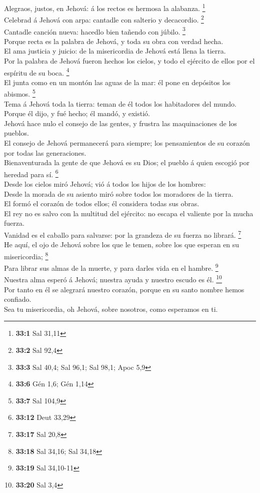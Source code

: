  Alegraos, justos, en Jehová: á los rectos es hermosa la
alabanza. \footnote{\textbf{33:1} Sal 31,11}\\
 Celebrad á Jehová con arpa: cantadle con salterio y
decacordio. \footnote{\textbf{33:2} Sal 92,4}\\
 Cantadle canción nueva: hacedlo bien tañendo con júbilo.
\footnote{\textbf{33:3} Sal 40,4; Sal 96,1; Sal 98,1; Apoc 5,9}\\
 Porque recta es la palabra de Jehová, y toda su obra con
verdad hecha.\\
 El ama justicia y juicio: de la misericordia de Jehová está
llena la tierra.\\
 Por la palabra de Jehová fueron hechos los cielos, y todo
el ejército de ellos por el espíritu de su boca. \footnote{\textbf{33:6}
  Gén 1,6; Gén 1,14}\\
 El junta como en un montón las aguas de la mar: él pone en
depósitos los abismos. \footnote{\textbf{33:7} Sal 104,9}\\
 Tema á Jehová toda la tierra: teman de él todos los
habitadores del mundo.\\
 Porque él dijo, y fué hecho; él mandó, y existió.\\
 Jehová hace nulo el consejo de las gentes, y frustra las
maquinaciones de los pueblos.\\
 El consejo de Jehová permanecerá para siempre; los
pensamientos de su corazón por todas las generaciones.\\
 Bienaventurada la gente de que Jehová es su Dios; el
pueblo á quien escogió por heredad para sí. \footnote{\textbf{33:12}
  Deut 33,29}\\
 Desde los cielos miró Jehová; vió á todos los hijos de los
hombres:\\
 Desde la morada de su asiento miró sobre todos los
moradores de la tierra.\\
 El formó el corazón de todos ellos; él considera todas sus
obras.\\
 El rey no es salvo con la multitud del ejército: no escapa
el valiente por la mucha fuerza.\\
 Vanidad es el caballo para salvarse: por la grandeza de su
fuerza no librará. \footnote{\textbf{33:17} Sal 20,8}\\
 He aquí, el ojo de Jehová sobre los que le temen, sobre
los que esperan en su misericordia; \footnote{\textbf{33:18} Sal 34,16;
  Sal 34,18}\\
 Para librar sus almas de la muerte, y para darles vida en
el hambre. \footnote{\textbf{33:19} Sal 34,10-11}\\
 Nuestra alma esperó á Jehová; nuestra ayuda y nuestro
escudo es él. \footnote{\textbf{33:20} Sal 3,4}\\
 Por tanto en él se alegrará nuestro corazón, porque en su
santo nombre hemos confiado.\\
 Sea tu misericordia, oh Jehová, sobre nosotros, como
esperamos en ti.


